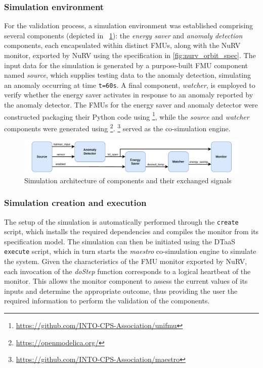 \subsubsection{Simulation environment}
For the validation process, a simulation environment was established
comprising several components (depicted in ~\cref{fig:nurv_fmi_simulation}): the \textit{energy saver} and \textit{anomaly detection} components, each encapsulated within distinct FMUs, along with the NuRV monitor, exported by NuRV using the specification in \cref{fig:nurv_orbit_spec}. The input data for the simulation is generated by a purpose-built FMU component named \textit{source}, which supplies testing data to the anomaly detection, simulating an anomaly occurring at time \texttt{t=60s}. A final component, \textit{watcher}, is employed to verify whether the energy saver activates in response to an anomaly reported by the anomaly detector. The FMUs for the energy saver and anomaly detector were constructed packaging their Python code using \footnote{\url{https://github.com/INTO-CPS-Association/unifmu}}, while the \textit{source} and \textit{watcher} components were generated using \footnote{\url{https://openmodelica.org/}}. \footnote{\url{https://github.com/INTO-CPS-Association/maestro}} served as the co-simulation engine.%
%
\begin{figure}[ht]
	\centering
	\includegraphics[width=\columnwidth]{images/FMI-communication.pdf}
	\caption{Simulation architecture of components and their exchanged signals}
	\label{fig:nurv_fmi_simulation}
\end{figure}%
%
\subsubsection{Simulation creation and execution}
The setup of the simulation is automatically performed through the \texttt{create} script, which installs the required dependencies and compiles the monitor from its specification model. The simulation can then be initiated using the DTaaS \texttt{execute} script, which in turn starts the \textit{maestro} co-simulation engine to simulate the system. Given the characteristics of the FMU monitor exported by NuRV, each invocation of the \textit{doStep} function corresponds to a logical heartbeat of the monitor. This allows the monitor component to assess the current values of its inputs and determine the appropriate outcome, thus providing the user the required information to perform the validation of the components.



